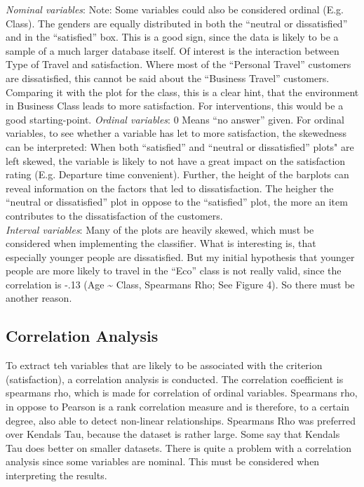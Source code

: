 \documentclass[
]{article}
\begin{document}
\emph{Nominal variables}: Note: Some variables could also be considered
ordinal (E.g. Class). The genders are equally distributed in both the
``neutral or dissatisfied'' and in the ``satisfied'' box. This is a good
sign, since the data is likely to be a sample of a much larger database
itself. Of interest is the interaction between Type of Travel and
satisfaction. Where most of the ``Personal Travel'' customers are
dissatisfied, this cannot be said about the ``Business Travel''
customers. Comparing it with the plot for the class, this is a clear
hint, that the environment in Business Class leads to more satisfaction.
For interventions, this would be a good starting-point. \emph{Ordinal
variables}: 0 Means ``no answer'' given. For ordinal variables, to see
whether a variable has let to more satisfaction, the skewedness can be
interpreted: When both ``satisfied'' and ``neutral or dissatisfied''
plots" are left skewed, the variable is likely to not have a great
impact on the satisfaction rating (E.g. Departure time convenient).
Further, the height of the barplots can reveal information on the
factors that led to dissatisfaction. The heigher the ``neutral or
dissatisfied'' plot in oppose to the ``satisfied'' plot, the more an
item contributes to the dissatisfaction of the customers.\\
\emph{Interval variables}: Many of the plots are heavily skewed, which
must be considered when implementing the classifier. What is interesting
is, that especially younger people are dissatisfied. But my initial
hypothesis that younger people are more likely to travel in the ``Eco''
class is not really valid, since the correlation is -.13 (Age
\textasciitilde{} Class, Spearmans Rho; See Figure 4). So there must be
another reason.

\hypertarget{correlation-analysis}{%
\subsection{Correlation Analysis}\label{correlation-analysis}}

To extract teh variables that are likely to be associated with the
criterion (satisfaction), a correlation analysis is conducted. The
correlation coefficient is spearmans rho, which is made for correlation
of ordinal variables. Spearmans rho, in oppose to Pearson is a rank
correlation measure and is therefore, to a certain degree, also able to
detect non-linear relationships. Spearmans Rho was preferred over
Kendals Tau, because the dataset is rather large. Some say that Kendals
Tau does better on smaller datasets. There is quite a problem with a
correlation analysis since some variables are nominal. This must be
considered when interpreting the results.
\end{document}

